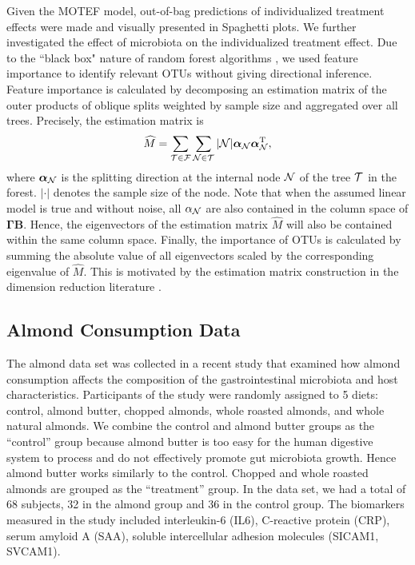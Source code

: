 \documentclass[smallextended]{svjour3}
\newcommand{\trnp}{^\text{T}}
\begin{document}
Given the MOTEF model, out-of-bag predictions of individualized treatment effects were made and visually presented in Spaghetti plots. We further investigated the effect of microbiota on the individualized treatment effect. Due to the ``black box" nature of random forest algorithms \citep{breiman2001statistical}, we used feature importance to identify relevant OTUs without giving directional inference. Feature importance is calculated by decomposing an estimation matrix of the outer products of oblique splits weighted by sample size and aggregated over all trees. Precisely, the estimation matrix is
\begin{equation*}
    \widehat{M} = \sum\limits_{{\cal T} \in {\cal F}} \sum\limits_{{\cal N} \in {\cal T}}|{\cal N}|\bm \alpha_{\cal N} \bm\alpha_{\cal N}\trnp,
\end{equation*}
where $\bm \alpha_{\cal N}$ is the splitting direction at the internal node ${\cal N}$ of the tree ${\cal T}$ in the forest. $|\cdot|$ denotes the sample size of the node. Note that when the assumed linear model is true and without noise, all $\alpha_{\cal N}$ are also contained in the column space of $\bm \Gamma \bm B$. Hence, the eigenvectors of the estimation matrix $\widehat{M}$ will also be contained within the same column space. Finally, the importance of OTUs is calculated by summing the absolute value of all eigenvectors scaled by the corresponding eigenvalue of $\widehat{M}$. This is motivated by the estimation matrix construction in the dimension reduction literature \citep{li1991sliced}.

\subsection{Almond Consumption Data}
The almond data set was collected in a recent study \citep{holscher2018almond} that examined how almond consumption affects the composition of the gastrointestinal microbiota and host characteristics. Participants of the study were randomly assigned to 5 diets: control, almond butter, chopped almonds, whole roasted almonds, and whole natural almonds. We combine the control and almond butter groups as the ``control'' group because almond butter is too easy for the human digestive system to process and do not effectively promote gut microbiota growth. Hence almond butter works similarly to the control. Chopped and whole roasted almonds are grouped as the ``treatment'' group. In the data set, we had a total of 68 subjects, 32 in the almond group and 36 in the control group. The biomarkers measured in the study included interleukin-6 (IL6), C-reactive protein (CRP), serum amyloid A (SAA), soluble intercellular adhesion molecules (SICAM1, SVCAM1).
\end{document}
